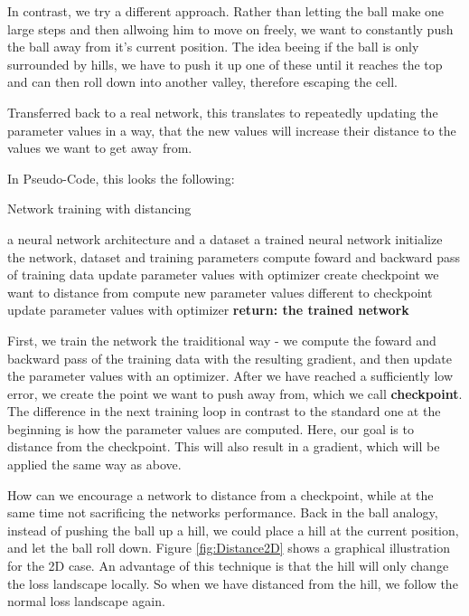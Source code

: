 In contrast, we try a different approach. Rather than letting the ball make one
large steps and then allwoing him to move on freely, we want to constantly push
the ball away from it's current position. The idea beeing if the ball is only
surrounded by hills, we have to push it up one of these until it reaches the top
and can then roll down into another valley, therefore escaping the cell.

Transferred back to a real network, this translates to repeatedly updating the
parameter values in a way, that the new values will increase their distance to
the values we want to get away from.

In Pseudo-Code, this looks the following:
\begin{algorithm}
    \begin{algorithmic}[1]
        \caption{Network training with distancing}
        \REQUIRE a neural network architecture and a dataset
        \ENSURE a trained neural network
        \STATE initialize the network, dataset and training parameters
            \STATE compute foward and backward pass of training data
            \STATE update parameter values with optimizer
        \ENDFOR
        \STATE create checkpoint we want to distance from
            \STATE compute new parameter values different to checkpoint
            \STATE update parameter values with optimizer
        \ENDFOR
        \STATE \textbf{return: the trained network}
    \end{algorithmic}
\end{algorithm}

First, we train the network the traiditional way - we compute the foward and
backward pass of the training data with the resulting gradient, and then update
the parameter values with an optimizer. After we have reached a sufficiently low
error, we create the point we want to push away from, which we call
\textbf{checkpoint}. The difference in the next training loop in contrast to the
standard one at the beginning is how the parameter values are computed. Here,
our goal is to distance from the checkpoint. This will also result in a
gradient, which will be applied the same way as above.

How can we encourage a network to distance from a checkpoint, while at the same
time not sacrificing the networks performance. Back in the ball analogy, instead
of pushing the ball up a hill, we could place a hill at the current position,
and let the ball roll down. Figure \ref{fig:Distance2D} shows a graphical
illustration for the 2D case. An advantage of this technique is that the hill
will only change the loss landscape locally. So when we have distanced from the
hill, we follow the normal loss landscape again.


